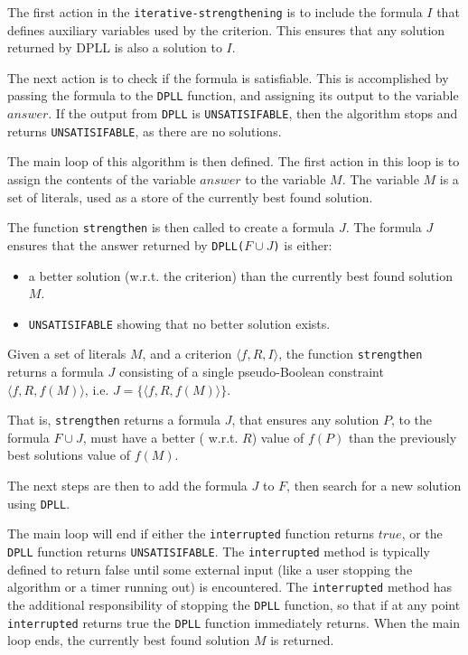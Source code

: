The first action in the \texttt{iterative-strengthening} is to include the formula $I$ that defines auxiliary variables used by the criterion.
This ensures that any solution returned by DPLL is also a solution to $I$.

The next action is to check if the formula is satisfiable.
This is accomplished by passing the formula to the \texttt{DPLL} function, and assigning its output to the variable $answer$.
If the output from \texttt{DPLL} is \texttt{UNSATISIFABLE}, then the algorithm stops and returns \texttt{UNSATISIFABLE}, as there are no solutions.

The main loop of this algorithm is then defined.
The first action in this loop is to assign the contents of the variable $answer$ to the variable $M$.
The variable $M$ is a set of literals, used as a store of the currently best found solution.

The function \texttt{strengthen} is then called to create a formula $J$.
The formula $J$ ensures that the answer returned by \texttt{DPLL(}$F \cup J$\texttt{)} is either:
\begin{itemize}
  \item a better solution (w.r.t. the criterion) than the currently best found solution $M$. 
  \item \texttt{UNSATISIFABLE} showing that no better solution exists.
\end{itemize}

\begin{defs}
Given a set of literals $M$, and a criterion $\langle f, R, I \rangle$,
the function \texttt{strengthen} returns a formula $J$ consisting of a single pseudo-Boolean constraint $\langle f,R,f(M) \rangle$, i.e. $ J = \{ \langle f,R,f(M) \rangle \}$.
\end{defs}
That is, \texttt{strengthen} returns a formula $J$,
that ensures any solution $P$, to the formula $F \cup J$, must have a better ( w.r.t. $R$) value of $f(P)$ than the previously best solutions value of $f(M)$.

The next steps are then to add the formula $J$ to $F$, then search for a new solution using \texttt{DPLL}.

The main loop will end if either the \texttt{interrupted} function returns $true$, or the \texttt{DPLL} function returns \texttt{UNSATISIFABLE}.
The \texttt{interrupted} method is typically defined to return false until some external input (like a user stopping the algorithm or a timer running out) is encountered.
The \texttt{interrupted} method has the additional responsibility of stopping the \texttt{DPLL} function, 
so that if at any point \texttt{interrupted} returns true the \texttt{DPLL} function immediately returns.
When the main loop ends, the currently best found solution $M$ is returned.

